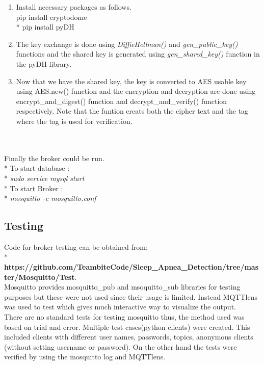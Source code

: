 \documentclass{report}
\begin{document}
\begin{itemize}
    \begin{enumerate}
        \item Install necessary packages as follows.\\
        \hspace*{1cm}pip install cryptodome\\*
        \hspace*{1cm}pip install pyDH
        \item The key exchange is done using \textit{DiffieHellman()} and \textit{gen\_public\_key()} functions and the shared key is generated using \textit{gen\_shared\_key()} function in the pyDH library. 
        \item Now that we have the shared key, the key is converted to AES usable key using AES.new() function and the encryption and decryption are done using encrypt\_and\_digest() function and decrypt\_and\_verify() function respectively. Note that the funtion creats both the cipher text and the tag where the tag is used for verification.
    \end{enumerate}
    
\end{itemize}\\
\\
Finally the broker could be run.\\*
To start database : \\*
    \hspace*{5cm}\textit{sudo service mysql start}\\*
To start Broker : \\*
    \hspace*{5cm}\textit{mosquitto -c mosquitto.conf}

\subsection{Testing}

Code for broker testing can be obtained from:\\*
\textbf{https://github.com/TeambiteCode/Sleep\_Apnea\_Detection/tree/master/Mosquitto/Test}.\\

Mosquitto provides mosquitto\_pub and msoquitto\_sub libraries for testing purposes but these were not used since their usage is limited. Instead MQTTlens was used to test which gives much interactive way to visualize the output.\\

There are no standard tests for testing mosquitto thus, the method used was based on trial and error. Multiple test cases(python clients) were created. This included clients with different user names, passwords, topics, anonymous clients (without setting username or password). On the other hand the tests were verified by using the mosquitto log and MQTTlens.\\
\end{document}
